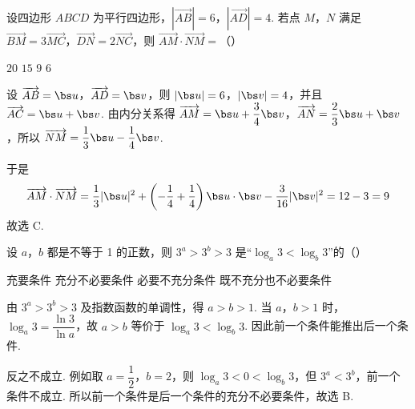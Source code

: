\begin{problem}
设四边形 \(ABCD\) 为平行四边形，\(\left|\overrightarrow{AB}\right| = 6\)，\(\left|\overrightarrow{AD}\right| = 4\). 若点 \(M\)，\(N\) 满足 \(\overrightarrow{BM} = 3\overrightarrow{MC}\)，\(\overrightarrow{DN} = 2\overrightarrow{NC}\)，则 \(\overrightarrow{AM} \cdot \overrightarrow{NM} =\)（\quad）

\choices
    {\(20\)}
    {\(15\)}
    {\(9\)}
    {\(6\)}


\begin{solution}
设 \(\overrightarrow{AB}=\bs u\)，\(\overrightarrow{AD}=\bs v\)，则 \(\lvert\bs u\rvert=6\)，\(\lvert\bs v\rvert=4\)，并且 \(\overrightarrow{AC}=\bs u+\bs v\). 由内分关系得
\(\overrightarrow{AM}=\bs u+\dfrac34\bs v\)，\(\overrightarrow{AN}=\dfrac23\bs u+\bs v\)，所以 \(\overrightarrow{NM}=\dfrac13\bs u-\dfrac14\bs v\).

于是
\[
\overrightarrow{AM}\cdot\overrightarrow{NM}=\frac13\lvert\bs u\rvert^{2}+
\left(-\frac14+\frac14\right)\bs u\cdot\bs v-\frac{3}{16}\lvert\bs v\rvert^{2}
=12-3=9
\]
故选 C.
\end{solution}
\end{problem}

\begin{problem}
设 \(a\)，\(b\) 都是不等于 1 的正数，则 \(3^{a} > 3^{b} > 3\) 是“\(\log_{a} 3 < \log_{b} 3\)”的（\quad）

\choices
    {充要条件}
    {充分不必要条件}
    {必要不充分条件}
    {既不充分也不必要条件}


\begin{solution}
由 \(3^{a}>3^{b}>3\) 及指数函数的单调性，得 \(a>b>1\). 当 \(a\)，\(b>1\) 时，\(\log_a3=\dfrac{\ln3}{\ln a}\)，故 \(a>b\) 等价于 \(\log_a3<\log_b3\). 因此前一个条件能推出后一个条件.

反之不成立. 例如取 \(a=\dfrac12\)，\(b=2\)，则 \(\log_a3<0<\log_b3\)，但 \(3^a<3^b\)，前一个条件不成立. 所以前一个条件是后一个条件的充分不必要条件，故选 B.
\end{solution}
\end{problem}


